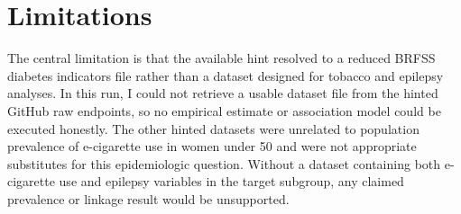 \documentclass[11pt]{article}
\begin{document}
\section{Limitations}
The central limitation is that the available hint resolved to a reduced BRFSS diabetes indicators file rather than a dataset designed for tobacco and epilepsy analyses. In this run, I could not retrieve a usable dataset file from the hinted GitHub raw endpoints, so no empirical estimate or association model could be executed honestly. The other hinted datasets were unrelated to population prevalence of e-cigarette use in women under 50 and were not appropriate substitutes for this epidemiologic question. Without a dataset containing both e-cigarette use and epilepsy variables in the target subgroup, any claimed prevalence or linkage result would be unsupported.



\end{document}
